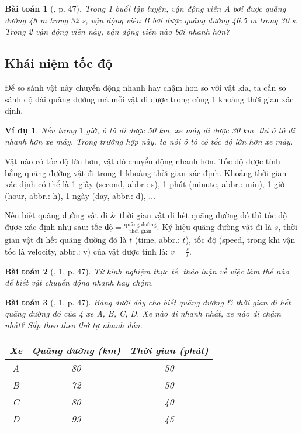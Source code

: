 \documentclass{article}
\newtheorem{baitoan}{Bài toán}
\newtheorem{vidu}{Ví dụ}
\begin{document}
\begin{baitoan}[\cite{SGK_KHTN_7_Canh_Dieu}, p. 47]
	Trong 1 buổi tập luyện, vận động viên A bơi được quãng đường \emph{48 m} trong \emph{32 s}, vận động viên B bơi được quãng đường \emph{46.5 m} trong \emph{30 s}. Trong 2 vận động viên này, vận động viên nào bơi nhanh hơn?
\end{baitoan}

\subsection{Khái niệm tốc độ}
Để so sánh vật này chuyển động nhanh hay chậm hơn so với vật kia, ta cần so sánh độ dài quãng đường mà mỗi vật đi được trong cùng 1 khoảng thời gian xác định.

\begin{vidu}
	Nếu trong $1$ giờ, ô tô đi được \emph{50 km}, xe máy đi được \emph{30 km}, thì ô tô đi nhanh hơn xe máy. Trong trường hợp này, ta nói ô tô \emph{có tốc độ lớn hơn} xe máy.
\end{vidu}
Vật nào có tốc độ lớn hơn, vật đó chuyển động nhanh hơn. Tốc độ được tính bằng quãng đường vật đi trong 1 khoảng thời gian xác định. Khoảng thời gian xác định có thể là 1 giây (second, abbr.: s), 1 phút (minute, abbr.: min), 1 giờ (hour, abbr.: h), 1 ngày (day, abbr.: d), $\ldots$

Nếu biết quãng đường vật đi \& thời gian vật đi hết quãng đường đó thì tốc độ được xác định như sau: $\mbox{tốc độ} = \frac{\mbox{quãng đường}}{\mbox{thời gian}}$. Ký hiệu quãng đường vật đi là $s$, thời gian vật đi hết quãng đường đó là $t$ (time, abbr.: $t$), tốc độ (speed, trong khi vận tốc là velocity, abbr.: v) của vật được tính là: $v = \frac{s}{t}$.

\begin{baitoan}[\cite{SGK_KHTN_7_Canh_Dieu}, 1, p. 47]
	Từ kinh nghiệm thực tế, thảo luận về việc làm thế nào để biết vật chuyển động nhanh hay chậm.
\end{baitoan}

\begin{baitoan}[\cite{SGK_KHTN_7_Canh_Dieu}, 1, p. 47]
	Bảng dưới đây cho biết quãng đường \& thời gian đi hết quãng đường đó của 4 xe A, B, C, D. Xe nào đi nhanh nhất, xe nào đi chậm nhất? Sắp theo theo thứ tự nhanh dần.
	\begin{table}[H]
		\centering
		\begin{tabular}{|c|c|c|}
			\hline
			Xe & Quãng đường (km) & Thời gian (phút) \\
			\hline
			A & 80 & 50 \\
			\hline
			B & 72 & 50 \\
			\hline
			C & 80 & 40 \\
			\hline
			D & 99 & 45 \\
			\hline
		\end{tabular}
	\end{table}
\end{baitoan}
\end{document}
